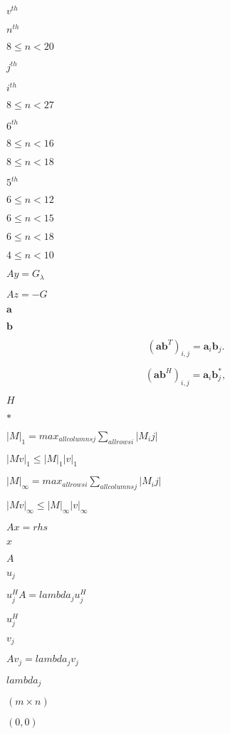 \documentclass{article}
\begin{document}
$ v^{th} $
\pagebreak

$ n^{th} $
\pagebreak

$ 8 \le n < 20 $
\pagebreak

$ j^{th} $
\pagebreak

$ i^{th} $
\pagebreak

$ 8 \le n < 27 $
\pagebreak

$ 6^{th} $
\pagebreak

$ 8 \le n < 16 $
\pagebreak

$ 8 \le n < 18 $
\pagebreak

$ 5^{th} $
\pagebreak

$ 6 \le n < 12 $
\pagebreak

$ 6 \le n < 15 $
\pagebreak

$ 6 \le n < 18 $
\pagebreak

$ 4 \le n < 10 $
\pagebreak

$ Ay=G_{\lambda} $
\pagebreak

$ Az = -G $
\pagebreak

$\mathbf{a}$
\pagebreak

$\mathbf{b}$
\pagebreak

\[ (\mathbf{a}\mathbf{b}^T)_{i,j} = \mathbf{a}_i \mathbf{b}_j . \]
\pagebreak

\[ (\mathbf{a}\mathbf{b}^H)_{i,j} = \mathbf{a}_i \mathbf{b}^*_j , \]
\pagebreak

$H$
\pagebreak

$*$
\pagebreak

$ |M|_1 = max_{all columns j} \sum_{all rows i} |M_ij| $
\pagebreak

$ |Mv|_1 \leq |M|_1 |v|_1 $
\pagebreak

$ |M|_\infty = max_{all rows i} \sum_{all columns j} |M_ij| $
\pagebreak

$ |Mv|_\infty \leq |M|_\infty |v|_\infty $
\pagebreak

$ A x = rhs $
\pagebreak

$ x $
\pagebreak

$ A $
\pagebreak

$ u_j $
\pagebreak

$ u_j^H A = lambda_j u_j^H $
\pagebreak

$ u_j^H $
\pagebreak

$ v_j $
\pagebreak

$ A v_j = lambda_j v_j $
\pagebreak

$ lambda_j $
\pagebreak

$(m \times n)$
\pagebreak

$(0,0)$
\pagebreak
\end{document}
